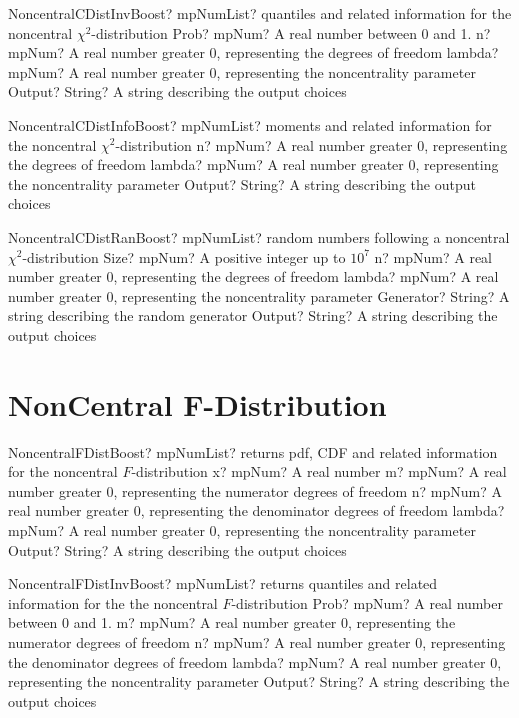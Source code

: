 \documentclass[12pt,a4paper,openany]{book}
\begin{document}
\begin{mpFunctionsExtract}
\mpFunctionFour
{NoncentralCDistInvBoost? mpNumList? quantiles and related information for the noncentral $\chi^2$-distribution}
{Prob? mpNum? A real number between 0 and 1.}
{n? mpNum? A real number greater 0, representing the degrees of freedom}
{lambda? mpNum? A real number greater 0, representing the noncentrality parameter}
{Output? String? A string describing the output choices}
\end{mpFunctionsExtract}

\begin{mpFunctionsExtract}
\mpFunctionThree
{NoncentralCDistInfoBoost? mpNumList? moments and related information for the noncentral $\chi^2$-distribution}
{n? mpNum? A real number greater 0, representing the degrees of freedom}
{lambda? mpNum? A real number greater 0, representing the noncentrality parameter}
{Output? String? A string describing the output choices}
\end{mpFunctionsExtract}

\begin{mpFunctionsExtract}
\mpFunctionFive
{NoncentralCDistRanBoost? mpNumList? random numbers following a noncentral $\chi^2$-distribution}
{Size? mpNum? A positive integer up to $10^7$}
{n? mpNum? A real number greater 0, representing the degrees of freedom}
{lambda? mpNum? A real number greater 0, representing the noncentrality parameter}
{Generator? String? A string describing the random generator}
{Output? String? A string describing the output choices}
\end{mpFunctionsExtract}

\section{NonCentral F-Distribution}

\begin{mpFunctionsExtract}
\mpFunctionFive
{NoncentralFDistBoost? mpNumList? returns pdf, CDF and related information for the noncentral $F$-distribution}
{x? mpNum? A real number}
{m? mpNum? A real number greater 0, representing the numerator  degrees of freedom}
{n? mpNum? A real number greater 0, representing the denominator degrees of freedom}
{lambda? mpNum? A real number greater 0, representing the noncentrality parameter}
{Output? String? A string describing the output choices}
\end{mpFunctionsExtract}

\begin{mpFunctionsExtract}
\mpFunctionFive
{NoncentralFDistInvBoost? mpNumList? returns quantiles and related information for the the noncentral $F$-distribution}
{Prob? mpNum? A real number between 0 and 1.}
{m? mpNum? A real number greater 0, representing the numerator  degrees of freedom}
{n? mpNum? A real number greater 0, representing the denominator degrees of freedom}
{lambda? mpNum? A real number greater 0, representing the noncentrality parameter}
{Output? String? A string describing the output choices}
\end{mpFunctionsExtract}
\end{document}
